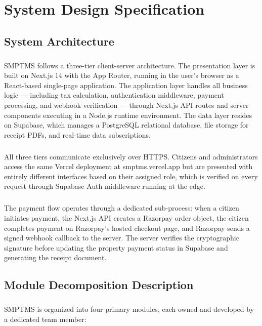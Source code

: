 \chapter{System Design Specification}
\section{System Architecture}
\paragraph{}SMPTMS follows a three-tier client-server architecture. The presentation layer is built on Next.js 14 with the App Router, running in the user's browser as a React-based single-page application. The application layer handles all business logic --- including tax calculation, authentication middleware, payment processing, and webhook verification --- through Next.js API routes and server components executing in a Node.js runtime environment. The data layer resides on Supabase, which manages a PostgreSQL relational database, file storage for receipt PDFs, and real-time data subscriptions.

\paragraph{}All three tiers communicate exclusively over HTTPS. Citizens and administrators access the same Vercel deployment at smptms.vercel.app but are presented with entirely different interfaces based on their assigned role, which is verified on every request through Supabase Auth middleware running at the edge.

\paragraph{}The payment flow operates through a dedicated sub-process: when a citizen initiates payment, the Next.js API creates a Razorpay order object, the citizen completes payment on Razorpay's hosted checkout page, and Razorpay sends a signed webhook callback to the server. The server verifies the cryptographic signature before updating the property payment status in Supabase and generating the receipt document.

\section{Module Decomposition Description}
\paragraph{}SMPTMS is organized into four primary modules, each owned and developed by a dedicated team member:

